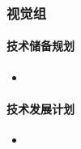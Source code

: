 \subsubsection{视觉组}

    \paragraph{技术储备规划}


        \begin{itemize}
            \item 
        \end{itemize}
        
    \paragraph{技术发展计划}


        \begin{itemize}
            \item 
        \end{itemize}